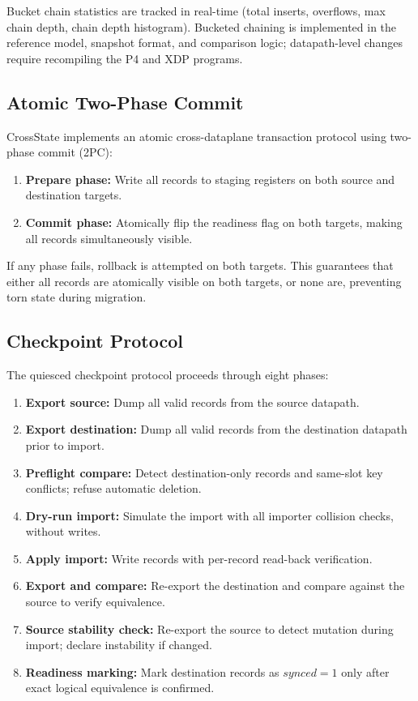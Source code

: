 \documentclass[10pt, conference]{IEEEtran}
\begin{document}
Bucket chain statistics are tracked in real-time (total inserts, overflows, max chain depth, chain depth histogram). Bucketed chaining is implemented in the reference model, snapshot format, and comparison logic; datapath-level changes require recompiling the P4 and XDP programs.

\subsection{Atomic Two-Phase Commit}
\label{subsec:atomic}
CrossState implements an atomic cross-dataplane transaction protocol using two-phase commit (2PC):
\begin{enumerate}
    \item \textbf{Prepare phase:} Write all records to staging registers on both source and destination targets.
    \item \textbf{Commit phase:} Atomically flip the readiness flag on both targets, making all records simultaneously visible.
\end{enumerate}
If any phase fails, rollback is attempted on both targets. This guarantees that either all records are atomically visible on both targets, or none are, preventing torn state during migration.

\subsection{Checkpoint Protocol}
\label{subsec:checkpoint_protocol}
The quiesced checkpoint protocol proceeds through eight phases:

\begin{enumerate}
    \item \textbf{Export source:} Dump all valid records from the source datapath.
    \item \textbf{Export destination:} Dump all valid records from the destination datapath prior to import.
    \item \textbf{Preflight compare:} Detect destination-only records and same-slot key conflicts; refuse automatic deletion.
    \item \textbf{Dry-run import:} Simulate the import with all importer collision checks, without writes.
    \item \textbf{Apply import:} Write records with per-record read-back verification.
    \item \textbf{Export and compare:} Re-export the destination and compare against the source to verify equivalence.
    \item \textbf{Source stability check:} Re-export the source to detect mutation during import; declare instability if changed.
    \item \textbf{Readiness marking:} Mark destination records as $synced=1$ only after exact logical equivalence is confirmed.
\end{enumerate}
\end{document}
